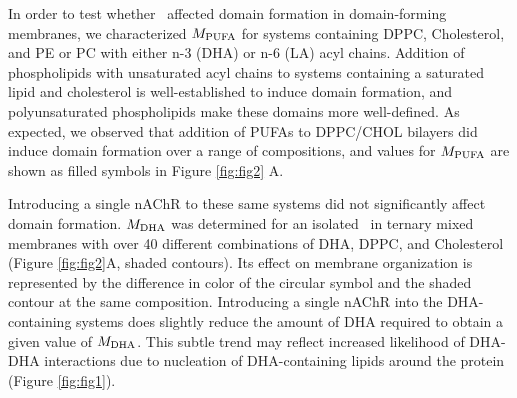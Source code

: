 	In order to test whether \nachr~affected domain formation in domain-forming membranes, we characterized $M_{\mathrm{PUFA}}$ for systems containing DPPC, Cholesterol, and PE or PC with either n-3 (DHA) or n-6 (LA) acyl chains.   Addition of phospholipids with unsaturated acyl chains to systems containing a saturated lipid and cholesterol is well-established to induce domain formation, and polyunsaturated phospholipids make these domains more well-defined\citep{Levental_Polyunsaturated_2016}. As expected, we observed that addition of PUFAs to DPPC/CHOL bilayers did induce domain formation over a range of compositions, and values for $M_{\mathrm{PUFA}}$ are shown as filled symbols in Figure \ref{fig:fig2} A. 
	
	Introducing a single nAChR to these same systems did not significantly affect domain formation. $M_{\mathrm{DHA}}$ was determined for an isolated \nachr~in ternary mixed membranes with over 40 different combinations of DHA, DPPC, and Cholesterol (Figure \ref{fig:fig2}A, shaded contours). Its effect on membrane organization is represented by the difference in color of the circular symbol and the shaded contour at the same composition.  Introducing a single nAChR into the DHA-containing systems does slightly reduce the amount of DHA required to obtain a given value of $M_{\mathrm{DHA}}$. 
	{ This subtle trend} may reflect increased likelihood of DHA-DHA interactions due to nucleation of DHA-containing lipids around the protein (Figure \ref{fig:fig1}). 

